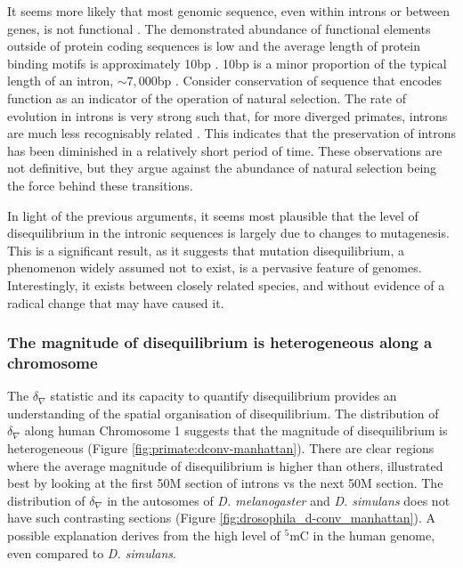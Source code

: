 It seems more likely that most genomic sequence, even within introns or between genes, is not functional \citep{Graur2013OnENCODE}. The demonstrated abundance of functional elements outside of protein coding sequences is low \citep{Graur2013OnENCODE} and the average length of protein binding motifs is approximately 10bp \citep{Stewart2012WhyLong}. 10bp is a minor proportion of the typical length of an intron, $\sim7,000$bp \citep{10.1093/database/baw153}. Consider conservation of sequence that encodes function as an indicator of the operation of natural selection. The rate of evolution in introns is very strong such that, for more diverged primates, introns are much less recognisably related \citep{Yi2002SlowHumans}. This indicates that the preservation of introns has been diminished in a relatively short period of time. These observations are not definitive, but they argue against the abundance of natural selection being the force behind these transitions. 

In light of the previous arguments, it seems most plausible that the level of disequilibrium in the intronic sequences is largely due to changes to mutagenesis.  This is a significant result, as it suggests that mutation disequilibrium, a phenomenon widely assumed not to exist, is a pervasive feature of genomes. Interestingly, it exists between closely related species, and without evidence of a radical change that may have caused it. 

\subsubsection{The magnitude of disequilibrium is heterogeneous along a chromosome }

The $\delta_\nabla$ statistic and its capacity to quantify disequilibrium provides an understanding of the spatial organisation of disequilibrium. The distribution of $\delta_\nabla$ along human Chromosome 1 suggests that the magnitude of disequilibrium is heterogeneous (Figure \ref{fig:primate:dconv-manhattan}). There are clear regions where the average magnitude of disequilibrium is higher than others, illustrated best by looking at the first 50M section of introns vs the next 50M section. The distribution of $\delta_\nabla$ in the autosomes of \textit{D. melanogaster} and \textit{D. simulans} does not have such contrasting sections (Figure \ref{fig:drosophila_d-conv_manhattan}). A possible explanation derives from the high level of $^5$mC in the human genome, even compared to \textit{D. simulans}. 

